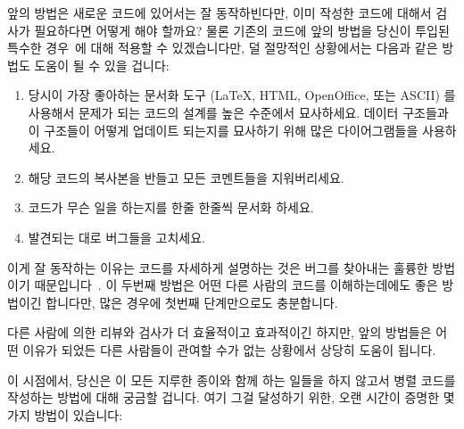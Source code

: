 앞의 방법은 새로운 코드에 있어서는 잘 동작하빈다만, 이미 작성한 코드에 대해서
검사가 필요하다면 어떻게 해야 할까요?
물론 기존의 코드에 앞의 방법을 당신이 투입된 특수한 경우~\cite{Brooks79}에 대해
적용할 수 있겠습니다만, 덜 절망적인 상황에서는 다음과 같은 방법도 도움이 될 수
있을 겁니다:

\begin{enumerate}
\item	당시이 가장 좋아하는 문서화 도구 (\LaTeX{}, HTML, OpenOffice, 또는
	ASCII) 를 사용해서 문제가 되는 코드의 설계를 높은 수준에서 묘사하세요.
	데이터 구조들과 이 구조들이 어떻게 업데이트 되는지를 묘사하기 위해 많은
	다이어그램들을 사용하세요.
\item	해당 코드의 복사본을 반들고 모든 코멘트들을 지워버리세요.
\item	코드가 무슨 일을 하는지를 한줄 한줄씩 문서화 하세요.
\item	발견되는 대로 버그들을 고치세요.

\end{enumerate}

이게 잘 동작하는 이유는 코드를 자세하게 설명하는 것은 버그를 찾아내는 훌륭한
방법이기 때문입니다~\cite{GlenfordJMyers1979}.
이 두번째 방법은 어떤 다른 사람의 코드를 이해하는데에도 좋은 방법이긴 합니다만,
많은 경우에 첫번째 단계만으로도 충분합니다.

다른 사람에 의한 리뷰와 검사가 더 효율적이고 효과적이긴 하지만, 앞의 방법들은
어떤 이유가 되었든 다른 사람들이 관여할 수가 없는 상황에서 상당히 도움이
됩니다.

이 시점에서, 당신은 이 모든 지루한 종이와 함께 하는 일들을 하지 않고서 병렬
코드를 작성하는 방법에 대해 궁금할 겁니다.
여기 그걸 달성하기 위한, 오랜 시간이 증명한 몇가지 방법이 있습니다:
\iffalse

